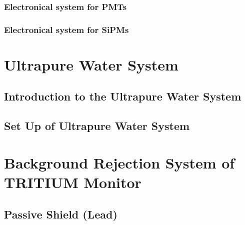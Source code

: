 \documentclass[12pt,a4paper]{book}
\begin{document}
			\subsubsection[Electronic Readout for PMTs]{Electronical system for PMTs}\label{subsubsec:PMTsElectronicalSystem}
			
			
			\subsubsection[Electronic Readout for SiPMs]{Electronical system for SiPMs}\label{subsubsec:SiPMsElectronicalSystem}
			
			\newpage		
		
	\section{Ultrapure Water System}\label{sec:UltraPureWaterSystem}
		
		\subsection[Introduction to the Water System]{Introduction to the Ultrapure Water System}\label{subsec:IntroductionWaterSystem}
		 
					
		\subsection[Water System Set Up]{Set Up of Ultrapure Water System}\label{subsec:SetUpWaterSystem}
		
		\newpage	
	
	\section[Background Rejection System]{Background Rejection System of TRITIUM Monitor}\label{sec:IntroductionBackground}
	 
	
		\subsection{Passive Shield (Lead)}\label{subsec:SetUpPassiveShield}
		
		
\end{document}
